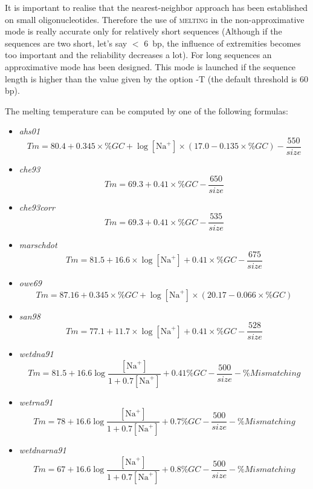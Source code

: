 \documentclass{article}
\begin{document}
It is important to realise that the nearest-neighbor approach has been established  
on small oligonucleotides. Therefore the use of \textsc{melting} in the non-approximative  
mode is really accurate only for relatively short sequences (Although if the sequences are 
two short, let's say $<$ 6~bp, the influence of extremities becomes too important and the  
reliability decreases a lot). For long sequences an approximative mode has been designed. 
This mode is launched if the sequence length is higher than the value given by the option -T 
(the default threshold is 60 bp).
 
The melting temperature can be computed by one of the following formulas:   
\begin{itemize}
\item \textit{ahs01}
\begin{displaymath}
Tm = 80.4 + 0.345 \times \%GC + \log[\mbox{Na}^+] \times (17.0 - 0.135 \times \%GC) - \frac{550}{size}
\end{displaymath}
\item \textit{che93}
\begin{displaymath}
Tm = 69.3 + 0.41 \times \%GC - \frac{650}{size}
\end{displaymath}
\item \textit{che93corr}
\begin{displaymath}
Tm = 69.3 + 0.41 \times \%GC - \frac{535}{size}
\end{displaymath}
\item \textit{marschdot}
\begin{displaymath}
Tm = 81.5 + 16.6 \times \log[\mbox{Na}^+] + 0.41 \times \%GC - \frac{675}{size}
\end{displaymath}
\item \textit{owe69}
\begin{displaymath}
Tm = 87.16 + 0.345 \times \%GC + \log[\mbox{Na}^+] \times (20.17 - 0.066 \times \%GC)
\end{displaymath}
\item \textit{san98}
\begin{displaymath}
Tm = 77.1 + 11.7 \times \log[\mbox{Na}^+] + 0.41 \times \%GC - \frac{528}{size}
\end{displaymath}
\item \textit{wetdna91}
\begin{displaymath}
Tm = 81.5 + 16.6\log\frac{[\mbox{Na}^+]}{1+0.7[\mbox{Na}^+]} + 0.41\% GC - \frac{500}{size} 
- \%Mismatching
\end{displaymath}
\item \textit{wetrna91}
\begin{displaymath}
Tm = 78 + 16.6\log\frac{[\mbox{Na}^+]}{1+0.7[\mbox{Na}^+]} + 0.7\% GC - \frac{500}{size}
- \%Mismatching
\end{displaymath}
\item \textit{wetdnarna91}
\begin{displaymath}
Tm = 67 + 16.6\log\frac{[\mbox{Na}^+]}{1+0.7[\mbox{Na}^+]} + 0.8\% GC - \frac{500}{size}
- \%Mismatching
\end{displaymath}
\end{itemize}
\end{document}
